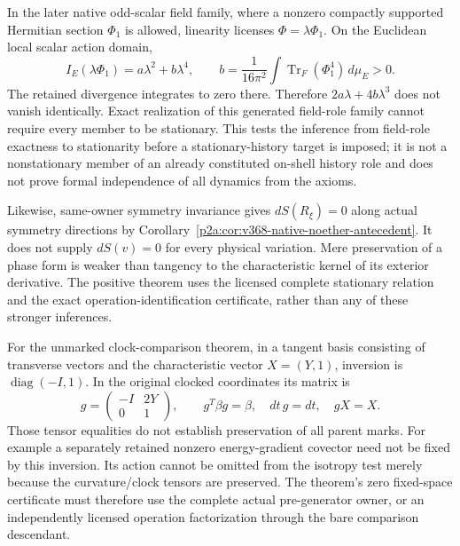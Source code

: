 \documentclass[11pt,a4paper]{article}
\begin{document}
In the later native odd-scalar field family, where a nonzero compactly
supported Hermitian section \(\Phi_1\) is allowed, linearity licenses
\(\Phi=\lambda\Phi_1\).  On the Euclidean local scalar action domain,
\[
 I_E(\lambda\Phi_1)=a\lambda^2+b\lambda^4,
 \qquad b=\frac1{16\pi^2}\int\operatorname{Tr}_F(\Phi_1^4)\,d\mu_E>0.
\]
The retained divergence integrates to zero there.  Therefore
\(2a\lambda+4b\lambda^3\) does not vanish identically.  Exact realization
of this generated field-role family cannot require every member to be
stationary.  This tests the inference from field-role exactness to
stationarity before a stationary-history target is imposed; it is not a
nonstationary member of an already constituted on-shell history role and
does not prove formal independence of all dynamics from the axioms.

Likewise, same-owner symmetry invariance gives
\(dS(R_\xi)=0\) along actual symmetry directions by
Corollary~\ref{p2a:cor:v368-native-noether-antecedent}.  It does not supply
\(dS(v)=0\) for every physical variation.  Mere preservation of a phase
form is weaker than tangency to the characteristic kernel of its exterior
derivative.  The positive theorem uses the licensed complete stationary
relation and the exact operation-identification certificate, rather than
any of these stronger inferences.

For the unmarked clock-comparison theorem, in a tangent basis consisting
of transverse vectors and the characteristic vector \(X=(Y,1)\), inversion
is \(\operatorname{diag}(-I,1)\).  In the original clocked coordinates its
matrix is
\[
 g=\begin{pmatrix}-I&2Y\\0&1\end{pmatrix},
 \qquad g^T\beta g=\beta,\quad dt\,g=dt,\quad gX=X.
\]
Those tensor equalities do not establish preservation of all parent marks.
For example a separately retained nonzero energy-gradient covector need
not be fixed by this inversion.  Its action cannot be omitted from the
isotropy test merely because the curvature/clock tensors are preserved.
The theorem's zero fixed-space certificate must therefore use the complete
actual pre-generator owner, or an independently licensed operation
factorization through the bare comparison descendant.
\end{document}
